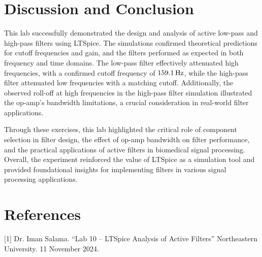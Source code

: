 \documentclass[12pt]{article}
\begin{document}
\section{Discussion and Conclusion}
This lab successfully demonstrated the design and analysis of active low-pass
and high-pass filters using LTSpice. The simulations confirmed theoretical
predictions for cutoff frequencies and gain, and the filters performed as
expected in both frequency and time domains. The low-pass filter effectively
attenuated high frequencies, with a confirmed cutoff frequency of $\SI{159.
1}{\hertz}$, while the high-pass filter attenuated low frequencies with a
matching cutoff. Additionally, the observed roll-off at high frequencies in the
high-pass filter simulation illustrated the op-amp’s bandwidth limitations, a
crucial consideration in real-world filter applications.
\newline

Through these exercises, this lab highlighted the critical role of component
selection in filter design, the effect of op-amp bandwidth on filter performance,
and the practical applications of active filters in biomedical signal
processing. Overall, the experiment reinforced the value of LTSpice as a
simulation tool and provided foundational insights for implementing filters in
various signal processing applications.


\section{References}
[1] Dr. Iman Salama. “Lab 10 – LTSpice Analysis of Active Filters” Northeastern University. 11 November 2024.
\end{document}
